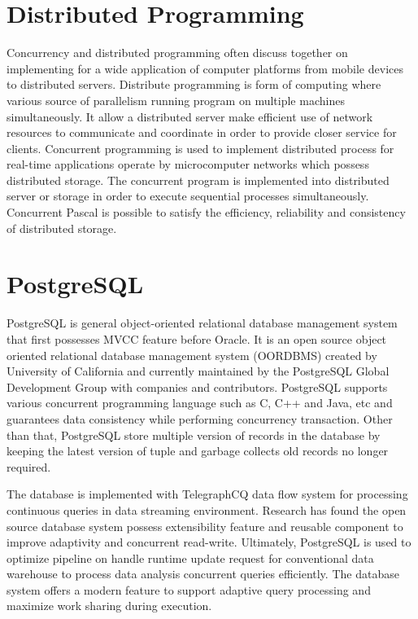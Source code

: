 \pagebreak

\section{Distributed Programming}

Concurrency and distributed programming often discuss together on implementing for a wide application of computer platforms from mobile devices to distributed servers. Distribute programming is form of computing where various source of parallelism running program on multiple machines simultaneously. It allow a distributed server make efficient use of network resources to communicate and coordinate in order to provide closer service for clients. \cite{language-learn-2017} Concurrent programming is used to implement distributed process for real-time applications operate by microcomputer networks which possess distributed storage. The concurrent program is implemented into distributed server or storage in order to execute sequential processes simultaneously. Concurrent Pascal is possible to satisfy the efficiency, reliability and consistency of distributed storage. \cite{concurrent-programming-concept} 

\pagebreak

\section{PostgreSQL}

PostgreSQL is general object-oriented relational database management system that first possesses MVCC feature before Oracle. It is an open source object oriented relational database management system (OORDBMS) created by University of California \cite{what-is-psql} and currently maintained by the PostgreSQL Global Development Group with companies and contributors. PostgreSQL supports various concurrent programming language such as C, C++ and Java, etc and guarantees data consistency while performing concurrency transaction. \cite{postgre-tutorial} Other than that, PostgreSQL store multiple version of records in the database by keeping the latest version of tuple and garbage collects old records no longer required. \cite{mvcc-survey} 

The database is implemented with TelegraphCQ data flow system for processing continuous queries in data streaming environment. Research has found the open source database system possess extensibility feature and reusable component to improve adaptivity and concurrent read-write. \cite{telegraphCQ-processing} Ultimately, PostgreSQL is used to optimize pipeline on handle runtime update request for conventional data warehouse to process data analysis concurrent queries efficiently. The database system offers a modern feature to support adaptive query processing and maximize work sharing during execution. \cite{postgre-performance}

